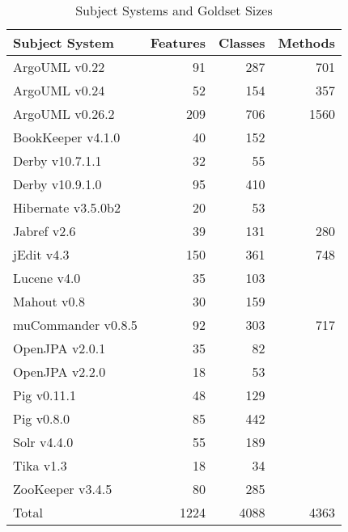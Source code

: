 \begin{table}[h]
\renewcommand{\arraystretch}{1.3}
\footnotesize
\centering
\caption{Subject Systems and Goldset Sizes}
\begin{tabular}{lrrr}
    \toprule
    Subject System      & Features  & Classes   & Methods \\
    \midrule
    ArgoUML v0.22 & 91 & 287 & 701 \\
    ArgoUML v0.24 & 52 & 154 & 357 \\
    ArgoUML v0.26.2 & 209 & 706 & 1560 \\
    BookKeeper v4.1.0 & 40 & 152 &   \\
    Derby v10.7.1.1 & 32 & 55 &   \\
    Derby v10.9.1.0 & 95 & 410 &   \\
    Hibernate v3.5.0b2 & 20 & 53 &   \\
    Jabref v2.6 & 39 & 131 & 280 \\
    jEdit v4.3 & 150 & 361 & 748 \\
    Lucene v4.0 & 35 & 103 &   \\
    Mahout v0.8 & 30 & 159 &   \\
    muCommander v0.8.5 & 92 & 303 & 717 \\
    OpenJPA v2.0.1 & 35 & 82 &   \\
    OpenJPA v2.2.0 & 18 & 53 &   \\
    Pig v0.11.1 & 48 & 129 &   \\
    Pig v0.8.0 & 85 & 442 &   \\
    Solr v4.4.0 & 55 & 189 &   \\
    Tika v1.3 & 18 & 34 &   \\
    ZooKeeper v3.4.5 & 80 & 285 &   \\
    \midrule
    Total & 1224 & 4088 & 4363 \\
    \bottomrule
\end{tabular}
\label{table:subjects}
\end{table}

